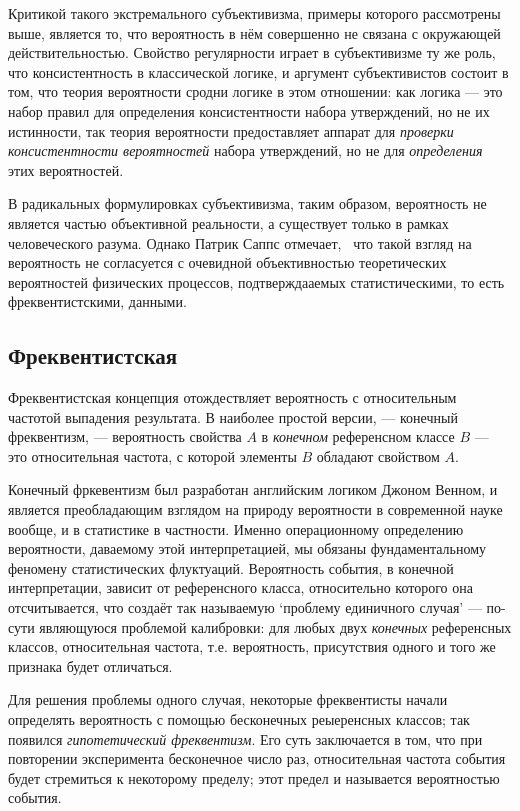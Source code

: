 \documentclass[14pt]{extarticle}
\begin{document}
Критикой такого экстремального субъективизма, примеры которого рассмотрены выше, является то, что вероятность в нём совершенно не связана с окружающей действительностью. Свойство регулярности играет в субъективизме ту же роль, что консистентность в классической логике, и аргумент субъективистов состоит в том, что теория вероятности сродни логике в этом отношении: как логика --- это набор правил для определения консистентности набора утверждений, но не их истинности, так теория вероятности предоставляет аппарат для \emph{проверки консистентности вероятностей} набора  утверждений, но не для \emph{определения} этих вероятностей.~\cite[стр. 4]{Fuchs}

В радикальных формулировках субъективизма, таким образом, вероятность не является частью объективной реальности, а существует только в рамках человеческого разума. Однако Патрик Саппс отмечает,~\cite{Suppes} что такой взгляд на вероятность не согласуется с очевидной объективностью теоретических вероятностей физических процессов, подтверждааемых статистическими, то есть фреквентистскими, данными.

\subsection{Фреквентистская}

Фреквентистская концепция отождествляет вероятность с относительным частотой выпадения результата. В наиболее простой версии, --- конечный фреквентизм, --- вероятность свойства $A$ в \emph{конечном} референсном классе $B$ --- это относительная частота, с которой элементы $B$ обладают свойством $A$.

Конечный фркевентизм был разработан английским логиком Джоном Венном, и является преобладающим взглядом на природу вероятности в современной науке вообще, и в статистике в частности. Именно операционному определению вероятности, даваемому этой интерпретацией, мы обязаны фундаментальному феномену статистических флуктуаций. Вероятность события, в конечной интерпретации, зависит от референсного класса, относительно которого она отсчитывается, что создаёт так называемую `проблему единичного случая' --- по-сути являющуюся проблемой калибровки: для любых двух \emph{конечных} референсных классов, относительная частота, т.е. вероятность, присутствия одного и того же признака будет отличаться.

Для решения проблемы одного случая, некоторые фреквентисты начали определять вероятность с помощью бесконечных реыеренсных классов; так появился \emph{гипотетический фреквентизм}. Его суть заключается в том, что при повторении эксперимента бесконечное число раз, относительная частота события будет стремиться к некоторому пределу; этот предел и называется вероятностью события.
\end{document}
